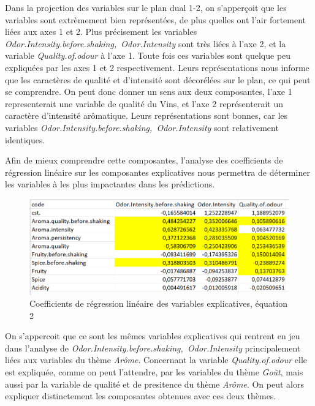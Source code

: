 \documentclass[a4paper,french,10pt]{article}
\begin{document}
Dans la projection des variables sur le plan dual 1-2, on s'apperçoit que les variables sont extrèmement bien représentées, de plus quelles ont l'air fortement liées aux axes 1 et 2. Plus précisement les variables \textit{Odor.Intensity.before.shaking,~Odor.Intensity} sont très liées à l'axe 2, et la variable \textit{Quality.of.odour} à l'axe 1. Toute fois ces variables sont quelque peu expliquées par les axes 1 et 2 respectivement. 
Leurs représentations nous informe que les caractères de qualité et d'intensité sont décorélées sur le plan, ce qui peut se comprendre.
On peut donc donner un sens aux deux composantes, l'axe 1 representerait une variable de qualité du Vins, et l'axe 2 représenterait un caractère d'intensité arômatique. \newline
Leurs représentations sont bonnes, car les variables \textit{Odor.Intensity.before.shaking,~Odor.Intensity} sont relativement identiques. 

Afin de mieux comprendre cette composantes, l'analyse des coefficients de régression linéaire sur les composantes explicatives nous permettra de déterminer les variables à les plus impactantes dans les prédictions. \newline

\begin{figure}[htp] 
	\centering
	\includegraphics[scale=0.45]{images/Coeff_var_Eq2.png}
	\caption{Coefficients de régression linéaire des variables explicatives, équation 2}
\end{figure}


On s'appercoit que ce sont les mêmes variables explicatives qui rentrent en jeu dans l'analyse de \textit{Odor.Intensity.before.shaking,~Odor.Intensity} principalement liées aux variables du thème \textit{Arôme}. Concernant la variable \textit{Quality.of.odour} elle est expliquée, comme on peut l'attendre, par les variables du thème \textit{Goût}, mais aussi par la variable de qualité et de presitence du thème \textit{Arôme}. On peut alors expliquer distinctement les composantes obtenues avec ces deux thèmes. \newline
\end{document}
